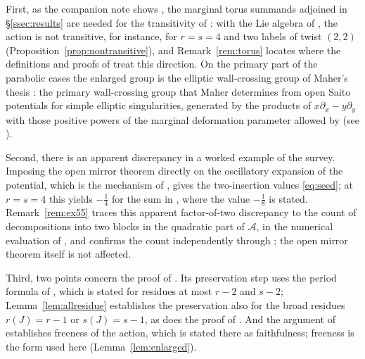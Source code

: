\documentclass[11pt]{amsart}
\theoremstyle{definition}
\theoremstyle{remark}
\newcommand{\Ascr}{\mathcal{A}}
\begin{document}
First, as the companion note shows \cite[Rem.~3.1 and Ex.~3.2]{note}, the
marginal torus summands adjoined in \S\ref{ssec:results} are
needed for the transitivity of \cite[Thm.~4.27]{GKT}: with the Lie algebra of
\cite[Def.~4.23]{GKT}, the action is not transitive, for instance, for $r=s=4$
and two labels of twist $(2,2)$ (Proposition~\ref{prop:nontransitive}), and
Remark~\ref{rem:torus} locates where the definitions and proofs of \cite{GKT}
treat this direction.
On the primary part of the parabolic cases the enlarged group is the elliptic
wall-crossing group of Maher's thesis \cite[\S5.2.2]{Maher}: the primary
wall-crossing group that Maher determines from open Saito potentials for
simple elliptic singularities, generated by the products of
$x\partial_x-y\partial_y$ with those positive powers of the marginal
deformation parameter allowed by \cite[(5.2.8)]{Maher} (see
\cite[Cor.~5.2.7, Prop.~5.2.10]{Maher}).

Second, there is an apparent discrepancy in a worked example of the survey.
Imposing the open mirror theorem \cite[Thm.~0.3]{GKT} directly on the
oscillatory expansion of the potential, which is the mechanism of
\cite[Thm.~0.2]{GKT}, gives the two-insertion values \eqref{eq:seed}; at $r=s=4$ this
yields $-\tfrac14$ for the sum in \cite[Ex.~5.5]{GKTsurvey}, where the value
$-\tfrac18$ is stated.  Remark~\ref{rem:ex55} traces this apparent
factor-of-two discrepancy to the count of decompositions into two blocks in
the quadratic part of $\Ascr$, in the numerical evaluation of
\cite[Ex.~5.5]{GKTsurvey}, and confirms the count
independently through \cite[Cor.~5.11(3)]{GKT}; the open mirror theorem itself
is not affected.

Third, two points concern the proof of \cite[Thm.~4.27]{GKT}.  Its
preservation step \cite[proof of Thm.~4.27, Step~1]{GKT} uses the period
formula of \cite[Thm.~4.9]{GKT}, which is stated for residues at most $r-2$
and $s-2$; Lemma~\ref{lem:allresidue} establishes the preservation also for
the broad residues $r(J)=r-1$ or $s(J)=s-1$, as does the proof of
\cite[Prop.~1.4]{note}.  And the argument of
\cite[Thm.~4.27, Step~2]{GKT} establishes freeness of the action, which is
stated there as faithfulness; freeness is the form used here
(Lemma~\ref{lem:enlarged}).
\end{document}
